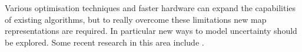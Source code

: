 Various optimisation techniques and faster hardware can expand the
capabilities of existing algorithms, but to really overcome these
limitations new map representations are required. In particular new
ways to model uncertainty should be explored. Some recent research in
this area include \cite{bosse03atlas,fergusson2003}.

